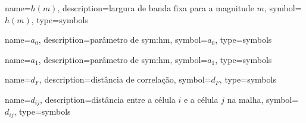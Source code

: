 {
	name={\ensuremath{h(m)}},
	description={largura de banda fixa para a magnitude $m$}, 
	symbol={\ensuremath{h(m)}}, 
	type=symbols
}



{
	name={\ensuremath{a_0}},
	description={parâmetro de \gls{sym:hm}}, 
	symbol={\ensuremath{a_0}}, 
	type=symbols
}



{
	name={\ensuremath{a_1}},
	description={parâmetro de \gls{sym:hm}}, 
	symbol={\ensuremath{a_1}}, 
	type=symbols
}




{
	name={\ensuremath{d_F}},
	description={distância de correlação}, 
	symbol={\ensuremath{d_F}}, 
	type=symbols
}


{
	name={\ensuremath{d_{ij}}},
	description={distância entre a célula $i$ e a célula $j$ na malha}, 
	symbol={\ensuremath{d_{ij}}}, 
	type=symbols
}



